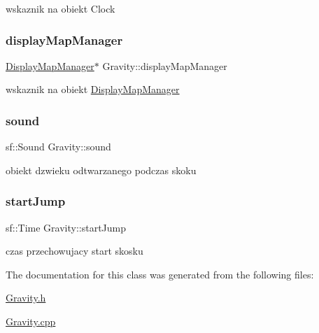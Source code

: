 wskaznik na obiekt Clock \mbox{\label{class_gravity_a72a7e04f7555e0f29d100c965ff5080f}} 
\subsubsection{\texorpdfstring{display\+Map\+Manager}{displayMapManager}}
{\footnotesize\ttfamily \hyperlink{class_display_map_manager}{Display\+Map\+Manager}$\ast$ Gravity\+::display\+Map\+Manager\hspace{0.3cm}{\ttfamily [protected]}}

wskaznik na obiekt \hyperlink{class_display_map_manager}{Display\+Map\+Manager} \mbox{\label{class_gravity_a5d636ab38b930cff4d585bfd374479b6}} 
\subsubsection{\texorpdfstring{sound}{sound}}
{\footnotesize\ttfamily sf\+::\+Sound Gravity\+::sound}

obiekt dzwieku odtwarzanego podczas skoku \mbox{\label{class_gravity_a9284458ed2208a9df9ea8f1bf1b6c36a}} 
\subsubsection{\texorpdfstring{start\+Jump}{startJump}}
{\footnotesize\ttfamily sf\+::\+Time Gravity\+::start\+Jump\hspace{0.3cm}{\ttfamily [protected]}}

czas przechowujacy start skosku 

The documentation for this class was generated from the following files\+:\begin{DoxyCompactItemize}
\item 
\hyperlink{_gravity_8h}{Gravity.\+h}\item 
\hyperlink{_gravity_8cpp}{Gravity.\+cpp}\end{DoxyCompactItemize}
